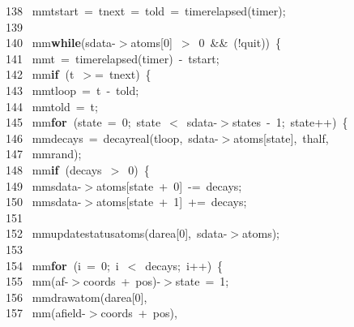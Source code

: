 \documentclass[10pt,a4paper]{article}
\newcommand{\hlstd}[1]{\textcolor[rgb]{0,0,0}{#1}}
\newcommand{\hlkey}[1]{\textcolor[rgb]{0,0,0}{\bf{#1}}}
\newcommand{\hlnum}[1]{\textcolor[rgb]{0.16,0.16,1}{#1}}
\newcommand{\hlline}[1]{\textcolor[rgb]{0.33,0.33,0.33}{#1}}
\begin{document}
{}\hlline{\ 138\ }\hlstd{\hlstd{ mm}tstart\ =\ tnext\ =\ told\ =\ timer\textunderscore elapsed(timer);\\
}\hlline{\ 139\ }\hlstd{\\
}\hlline{\ 140\ }\hlstd{\hlstd{ mm}}\hlkey{while}\hlstd{(sdata-$>$atoms[}\hlnum{0}\hlstd{]\ $>$\ }\hlnum{0\ }\hlstd{\&\&\ (!quit))\ \{\\
}\hlline{\ 141\ }\hlstd{\hlstd{ mm}t\ =\ timer\textunderscore elapsed(timer)\ -\ tstart;\\
}\hlline{\ 142\ }\hlstd{\hlstd{ mm}}\hlkey{if\ }\hlstd{(t\ $>$=\ tnext)\ \{\\
}\hlline{\ 143\ }\hlstd{\hlstd{ mm}tloop\ =\ t\ -\ told;\\
}\hlline{\ 144\ }\hlstd{\hlstd{ mm}told\ =\ t;\\
}\hlline{\ 145\ }\hlstd{\hlstd{ mm}}\hlkey{for\ }\hlstd{(state\ =\ }\hlnum{0}\hlstd{;\ state\ $<$\ sdata-$>$states\ }\hlnum{-\ 1}\hlstd{;\ state++)\ \{\\
}\hlline{\ 146\ }\hlstd{\hlstd{ mm}decays\ =\ decay\textunderscore real(tloop,\ sdata-$>$atoms[state],\ thalf,\\
}\hlline{\ 147\ }\hlstd{\hlstd{ mm}rand);\\
}\hlline{\ 148\ }\hlstd{\hlstd{ mm}}\hlkey{if\ }\hlstd{(decays\ $>$\ }\hlnum{0}\hlstd{)\ \{\\
}\hlline{\ 149\ }\hlstd{\hlstd{ mm}sdata-$>$atoms[state\ +\ }\hlnum{0}\hlstd{]\ -=\ decays;\\
}\hlline{\ 150\ }\hlstd{\hlstd{ mm}sdata-$>$atoms[state\ +\ }\hlnum{1}\hlstd{]\ +=\ decays;\\
}\hlline{\ 151\ }\hlstd{\\
}\hlline{\ 152\ }\hlstd{\hlstd{ mm}update\textunderscore status\textunderscore atoms(darea[}\hlnum{0}\hlstd{],\ sdata-$>$atoms);\\
}\hlline{\ 153\ }\hlstd{\\
}\hlline{\ 154\ }\hlstd{\hlstd{ mm}}\hlkey{for\ }\hlstd{(i\ =\ }\hlnum{0}\hlstd{;\ i\ $<$\ decays;\ i++)\ \{\\
}\hlline{\ 155\ }\hlstd{\hlstd{ mm}(af-$>$coords\ +\ pos)-$>$state\ =\ }\hlnum{1}\hlstd{;\\
}\hlline{\ 156\ }\hlstd{\hlstd{ mm}draw\textunderscore atom(darea[}\hlnum{0}\hlstd{],\\
}\hlline{\ 157\ }\hlstd{\hlstd{ mm}(afield-$>$coords\ +\ pos),\\
}
\end{document}
